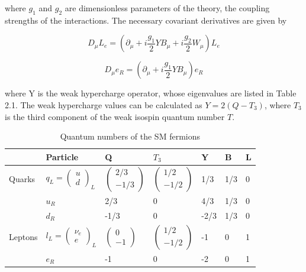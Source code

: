 where $g_{1}$ and $g_{2}$ are dimensionless parameters of the theory, the coupling strengths of the interactions. The necessary covariant derivatives are given by

\begin{equation}
D_{\mu}L_{e} = (\partial_{\mu}+i\frac{g_{1}}{2}YB_{\mu}+i\frac{g_{2}}{2}W_{\mu})L_{e}
\end{equation}

\begin{equation}
D_{\mu}e_{R} = (\partial_{\mu}+i\frac{g_{1}}{2}YB_{\mu})e_{R}
\end{equation}
 
 where Y is the weak hypercharge operator, whose eigenvalues are listed in Table 2.1. The weak hypercharge values can be calculated as $Y=2(Q-T_{3})$, where $T_{3}$ is the third component of the weak isospin quantum number $T$.

 \begin{table}[h!]
	\centering
	\label{qun}
	\begin{tabular}{|l|l|l|l|l|l|l|}
		\hline
		                & Particle & Q   & $T_{3}$ & Y & B & L \\ \hline
		Quarks          & $q_{L} = \begin{pmatrix}
									u \\
									d
									\end{pmatrix}_{L}$ & $\begin{pmatrix} 2/3 \\ -1/3 \end{pmatrix}$  & $\begin{pmatrix} 1/2 \\ -1/2 \end{pmatrix}$ & 1/3 & 1/3 & 0 \\ 
		                & $u_{R}$ & 2/3 & 0 & 4/3 & 1/3 & 0 \\ 
		                & $d_{R}$ & -1/3& 0 & -2/3 & 1/3 & 0 \\ \hline
		Leptons         & $l_{L} = \begin{pmatrix} \nu_{e}\\ e \end{pmatrix}_{L}$ & $\begin{pmatrix} 0 \\ -1 \end{pmatrix}$ & $\begin{pmatrix} 1/2 \\ -1/2 \end{pmatrix}$ & -1 & 0 & 1 \\
		                & $e_{R}$ & -1 & 0 & -2 & 0 & 1 \\ \hline
	
	\end{tabular}
	\caption{Quantum numbers of the SM fermions}
\end{table}

